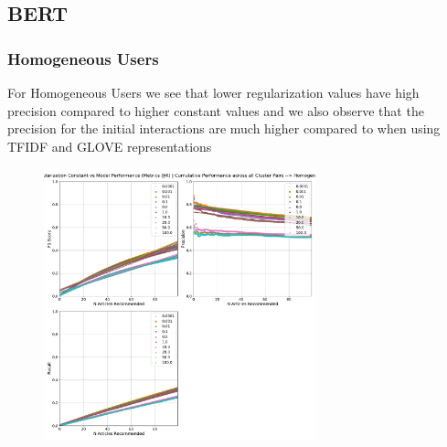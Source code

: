 \documentclass[a4paper,fontsize=8.0pt]{scrartcl}
\begin{document}
\subsection{BERT}
\subsubsection{Homogeneous Users}
\begin{flushleft}
For Homogeneous Users we see that lower regularization values have high precision compared to higher constant values and we also observe that the precision for the initial interactions are much higher compared to when using TFIDF and GLOVE representations
\end{flushleft}
\begin{figure}[H]
 \includegraphics[width=0.7\textwidth]{Graphs/BERT/regularization_vs_model_performance_cumu_Homogeneous.pdf}
\end{figure}
\end{document}
